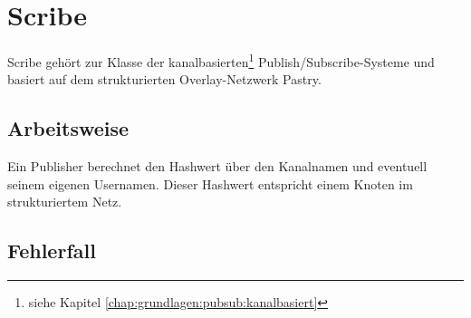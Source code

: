 \section{Scribe}
\label{chap:related:scribe}
Scribe \cite{citeulike:345316} gehört zur Klasse der kanalbasierten\footnote{siehe Kapitel \ref{chap:grundlagen:pubsub:kanalbasiert}} Publish/Subscribe-Systeme und basiert auf dem strukturierten Overlay-Netzwerk Pastry\cite{citeulike:780210}.

\subsection{Arbeitsweise}
Ein Publisher berechnet den Hashwert über den Kanalnamen und eventuell seinem eigenen Usernamen. Dieser Hashwert entspricht einem Knoten im strukturiertem Netz.

\subsection{Fehlerfall}
